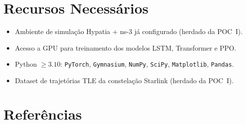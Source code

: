 \documentclass[12pt,a4paper]{article}
\begin{document}
\section{Recursos Necessários}

\begin{itemize}
  \item Ambiente de simulação Hypatia + ns-3 já configurado (herdado da POC~I).
  \item Acesso a GPU para treinamento dos modelos LSTM, Transformer e PPO.
  \item Python $\geq 3.10$: \texttt{PyTorch}, \texttt{Gymnasium},
        \texttt{NumPy}, \texttt{SciPy}, \texttt{Matplotlib}, \texttt{Pandas}.
  \item Dataset de trajetórias TLE da constelação Starlink (herdado da POC~I).
\end{itemize}

\section*{Referências}
\end{document}
